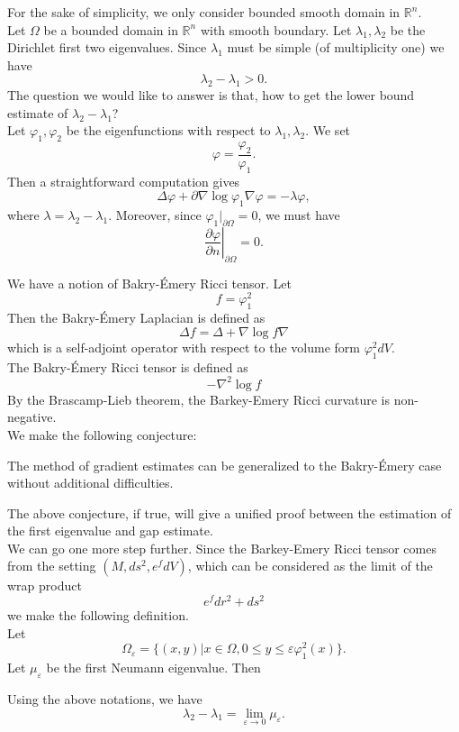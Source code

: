 For the sake of simplicity, we only consider bounded smooth domain in 
$\mathbb{R}^n$.
\\

Let $\Omega$ be a bounded domain in $\mathbb{R}^n$ with smooth boundary. Let
$\lambda_1, \lambda_2$ be the Dirichlet first two eigenvalues. Since $\lambda_1$
must be simple (of multiplicity one) we have
\[
\lambda_2 - \lambda_1> 0.
\]
The question we would like to answer is that, how to get the lower bound 
estimate of $\lambda_2 - \lambda_1$?
\\

Let $\varphi_1, \varphi_2$ be the eigenfunctions with respect to 
$\lambda_1, \lambda_2$. We set
\[
\varphi = \frac{\varphi_2}{\varphi_1}.
\]
Then a straightforward computation gives
\[
\Delta\varphi + \partial\nabla\log\varphi_1\nabla\varphi = -\lambda\varphi,
\]
where $\lambda = \lambda_2 - \lambda_1$. Moreover, since 
$\varphi_1|_{\partial\Omega} = 0$, we must have
\[
\left.\frac{\partial\varphi}{\partial n}\right|_{\partial\Omega} = 0.
\]

We have a notion of Bakry-\'Emery Ricci tensor. Let
\[
f = \varphi_1^2
\]
Then the Bakry-\'Emery Laplacian is defined as
\[
\Delta f = \Delta + \nabla\log f\nabla
\]
which is a self-adjoint operator with respect to the volume form 
$\varphi_1^2 dV$.
\\

The Bakry-\'Emery Ricci tensor is defined as
\[
-\nabla^2 \log f
\]
By the Brascamp-Lieb theorem, the Barkey-Emery Ricci curvature is non-negative.
\\

We make the following conjecture:
\begin{conjecture}
The method of gradient estimates can be generalized to the Bakry-\'Emery case
without additional difficulties.
\end{conjecture}

The above conjecture, if true, will give a unified proof between the estimation
of the first eigenvalue and gap estimate.
\\

We can go one more step further. Since the Barkey-Emery Ricci tensor comes from
the setting $(M, ds^2, e^f dV)$, which can be considered as the limit of the
wrap product
\[
e^f dr^2 + ds^2
\]
we make the following definition.
\\

Let
\[
\Omega_\varepsilon = \{(x,y)|x\in \Omega, 
0\leqslant y \leqslant \varepsilon \varphi_1^2(x)\}.
\]
Let $\mu_\varepsilon$ be the first Neumann eigenvalue. Then
\begin{conjecture}\label{conj4}
Using the above notations, we have
\[
\lambda_2 - \lambda_1 = \lim_{\varepsilon\rightarrow 0} \mu_\varepsilon.
\]
\end{conjecture}

